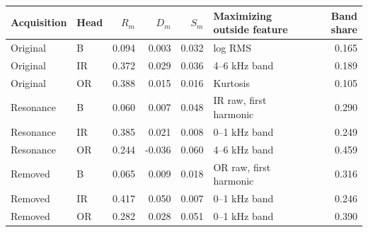 \begin{tabular}{llrrrlr}
\toprule
Acquisition & Head & $R_m$ & $D_m$ & $S_m$ & Maximizing outside feature & Band share \\
\midrule
Original & B & 0.094 & 0.003 & 0.032 & log RMS & 0.165 \\
Original & IR & 0.372 & 0.029 & 0.036 & 4--6 kHz band & 0.189 \\
Original & OR & 0.388 & 0.015 & 0.016 & Kurtosis & 0.105 \\
Resonance & B & 0.060 & 0.007 & 0.048 & IR raw, first harmonic & 0.290 \\
Resonance & IR & 0.385 & 0.021 & 0.008 & 0--1 kHz band & 0.249 \\
Resonance & OR & 0.244 & -0.036 & 0.060 & 4--6 kHz band & 0.459 \\
Removed & B & 0.065 & 0.009 & 0.018 & OR raw, first harmonic & 0.316 \\
Removed & IR & 0.417 & 0.050 & 0.007 & 0--1 kHz band & 0.246 \\
Removed & OR & 0.282 & 0.028 & 0.051 & 0--1 kHz band & 0.390 \\
\bottomrule
\end{tabular}
